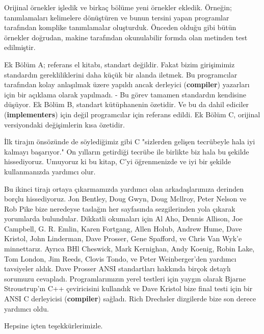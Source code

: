 \documentclass[a4paper,12pt,oneside]{book}
\begin{document}
\thispagestyle{preface} \noindent Orijinal örnekler işledik ve birkaç bölüme yeni örnekler ekledik. Örneğin; tanımlamaları kelimelere dönüştüren ve bunun tersini yapan programlar tarafından komplike tanımlamalar oluşturduk. Önceden olduğu gibi bütün örnekler doğrudan, makine tarafından okunulabilir formda olan metinden test edilmiştir.
\par Ek Bölüm A; referans el kitabı, standart değildir. Fakat bizim girişimimiz standardın gerekliliklerini daha küçük bir alanda iletmek. Bu programcılar tarafından kolay anlaşılmak üzere yapıldı ancak derleyici (\textbf{compiler}) yazarları için bir açıklama olarak yapılmadı. - Bu görev tamamen standardın kendisine düşüyor. Ek Bölüm B, standart kütüphanenin özetidir. Ve bu da dahil ediciler (\textbf{implementers}) için değil programcılar için referans edildi. Ek Bölüm C, orijinal versiyondaki değişimlerin kısa özetidir.
\par İlk tirajın önsözünde de söylediğimiz gibi C "sizlerden gelişen tecrübeyle hala iyi kalmayı başarıyor." On yılların getirdiği tecrübe ile birlikte biz hala bu şekilde hissediyoruz. Umuyoruz ki bu kitap, C'yi öğrenmenizde ve iyi bir şekilde kullanmanızda yardımcı olur.
\par Bu ikinci tirajı ortaya çıkarmamızda yardımcı olan arkadaşlarımıza derinden borçlu hissediyoruz.  Jon Bentley, Doug Gwyn, Doug Mcllroy, Peter Nelson ve Rob Pike bize neredeyse taslağın her sayfasında sezgilerinden yola çıkarak yorumlarda bulundular. Dikkatli okumaları için  Al Aho, Dennis Allison, Joe Campbell, G. R. Emlin, Karen Fortgang, Allen Holub, Andrew Hume, Dave Kristol, John Linderman, Dave Prosser, Gene Spafford, ve Chris Van Wyk'e minnettarız. Ayrıca  BHl Cheswick, Mark Kernighan, Andy Koenig, Robin Lake, Tom London, Jim Reeds, Clovis Tondo, ve Peter Weinberger'den yardımcı tavsiyeler aldık. Dave Prosser ANSI standartları hakkında birçok detaylı sorumuzu cevapladı. Programlarımızın yerel testleri için yaygın olarak  Bjarne Stroustrup'ın C++ çeviricisini kullandık ve Dave Kristol bize final testi için bir ANSI C derleyicisi (\textbf{compiler}) sağladı. Rich Drechsler dizgilerde bize son derece yardımcı oldu.
\par Hepsine içten teşekkürlerimizle.
\newline

\noindent \hspace*{270pt}{Brian W. Kernighan \\}
\hspace*{280pt}{Dennis M. Ritchie}
\end{document}
